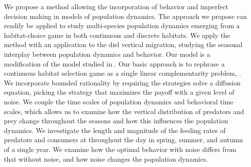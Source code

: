 We propose a method allowing the incorporation of behavior and imperfect decision making in models of population dynamics. The approach we propose can readily be applied to study multi-species population dynamics emerging from a habitat-choice game in both continuous and discrete habitats. We apply the method with an application to the diel vertical migration, studying the seasonal interplay between population dynamics and behavior. Our model is a modification of the model studied in \citep{verticalmigration}. Our basic approach is to rephrase a continuous habitat selection game as a single linear complementarity problem, \citep{miller1991copositive}. We incorporate bounded rationality by requiring the strategies solve a diffusion equation, picking the strategy that maximizes the payoff with a given level of noise.
We couple the time scales of population dynamics and behavioral time scales, which allows us to examine how the vertical distribution of predators and prey change throughout the seasons and how this influences the population dynamics. We investigate the length and magnitude of the feeding rates of predators and consumers at throughout the day in spring, summer, and autumn of a single year. We examine how the optimal behavior with noise differs from that without noise, and how noise changes the population dynamics.

